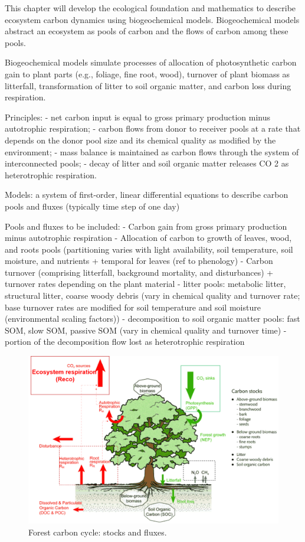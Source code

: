 \documentclass[12pt,oneside]{book}
\begin{document}
This chapter will develop the ecological foundation and mathematics to
describe ecosystem carbon dynamics using biogeochemical models.
Biogeochemical models abstract an ecosystem as pools of carbon and the
flows of carbon among these pools.

Biogeochemical models simulate processes of allocation of photosynthetic
carbon gain to plant parts (e.g., foliage, fine root, wood), turnover of
plant biomass as litterfall, transformation of litter to soil organic
matter, and carbon loss during respiration.

Principles: - net carbon input is equal to gross primary production
minus autotrophic respiration; - carbon flows from donor to receiver
pools at a rate that depends on the donor pool size and its chemical
quality as modified by the environment; - mass balance is maintained as
carbon flows through the system of interconnected pools; - decay of
litter and soil organic matter releases CO 2 as heterotrophic
respiration.

Models: a system of first-order, linear differential equations to
describe carbon pools and fluxes (typically time step of one day)

Pools and fluxes to be included: - Carbon gain from gross primary
production minus autotrophic respiration - Allocation of carbon to
growth of leaves, wood, and roots pools (partitioning varies with light
availability, soil temperature, soil moisture, and nutrients + temporal
for leaves (ref to phenology) - Carbon turnover (comprising litterfall,
background mortality, and disturbances) + turnover rates depending on
the plant material - litter pools: metabolic litter, structural litter,
coarse woody debris (vary in chemical quality and turnover rate; base
turnover rates are modified for soil temperature and soil moisture
(environmental scaling factors)) - decomposition to soil organic matter
pools: fast SOM, slow SOM, passive SOM (vary in chemical quality and
turnover time) - portion of the decomposition flow lost as heterotrophic
respiration

\begin{figure}

{\centering \includegraphics[width=0.8\linewidth]{figures/chap5/f52_stocks_fluxes} 

}

\caption{Forest carbon cycle: stocks and fluxes.}\label{fig:f52}
\end{figure}
\end{document}
